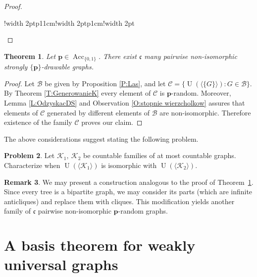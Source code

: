 \documentclass{amsart}
\newtheorem{theorem}{Theorem}[section]
\theoremstyle{plain}
\theoremstyle{definition}
\newtheorem{prob}[theorem]{Problem}
\newtheorem{rem}[theorem]{Remark}
\theoremstyle{remark}
\numberwithin{equation}{section}
\newcommand{\K}{\mathcal{K}}
\newcommand{\mc}{\mathcal}
\newcommand{\cc}{\mathfrak{c}}
\DeclareMathOperator{\UN}{U}
\DeclareMathOperator{\Acc}{Acc}
\begin{document}
\begin{proof}
\begin{center}
\begin{tabular}{!{\color{white}\vrule width 2pt}p{11cm}!{\color{white}\vrule width 2pt}p{1cm}!{\color{white}\vrule width 2pt}}

\end{tabular}
    
\end{center}



\end{proof}
\begin{theorem}\label{T:ContGraphs}
    Let $\textbf{p} \in \Acc_{\{0,1\}}$. There exist $\cc$ many pairwise non-isomorphic strongly $\{\textbf{p}\}$-drawable graphs. 
\end{theorem}
\begin{proof}
    Let $\mc{B}$ be given by Proposition \ref{P:Las}, and let $\mc{C}=\{\UN(\langle\{G\}\rangle): G \in \mc{B}\}$. By Theorem \ref{T:GenerowanieK} every element of $\mc{C}$ is $\textbf{p}$-random. Moreover, Lemma \ref{L:OdzyskacDS} and Observation \ref{O:stopnie wierzcholkow} assures that elements of $\mc{C}$ generated by different elements of $\mc{B}$ are non-isomorphic. Therefore existence of the family $\mc{C}$ proves our claim.
\end{proof}


The above considerations suggest stating the following problem. 
\begin{prob}
    Let $\K_1, \ \K_2$ be countable families of at most countable graphs.
    Characterize when $\UN(\langle \K_1 \rangle)$ is isomorphic with $\UN(\langle\K_2\rangle)$.
\end{prob}
\begin{rem}
We may present a construction analogous to the proof of Theorem~\ref{T:ContGraphs}.  
Since every tree is a bipartite graph, we may consider its parts (which are infinite anticliques)  
and replace them with cliques.  
This modification yields another family of \(\mathfrak{c}\) pairwise non-isomorphic \(\mathbf{p}\)-random graphs.
\end{rem}


\section{A basis theorem for weakly universal graphs}\label{section A basis theorem for weakly universal graphs}
\end{document}

